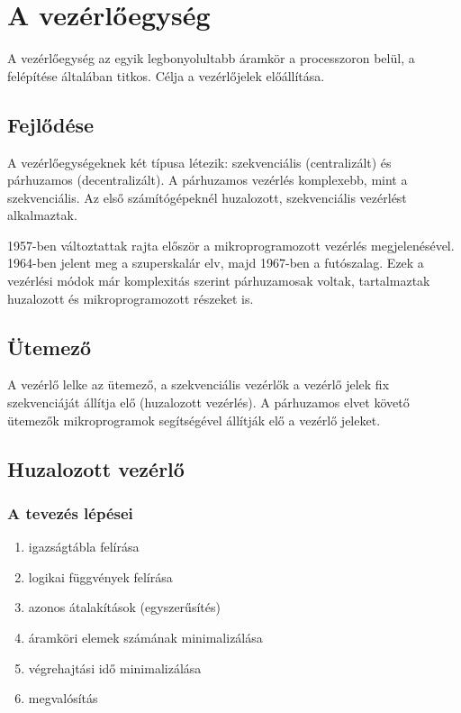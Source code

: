 
\chapter{A vezérlőegység}

A vezérlőegység az egyik legbonyolultabb áramkör a processzoron belül, a felépítése általában titkos.
Célja a vezérlőjelek előállítása.

\section{Fejlődése}
A vezérlőegységeknek két típusa létezik: szekvenciális (centralizált) és párhuzamos (decentralizált).
A párhuzamos vezérlés komplexebb, mint a szekvenciális.
Az első számítógépeknél huzalozott, szekvenciális vezérlést alkalmaztak.

1957-ben változtattak rajta először a mikroprogramozott vezérlés megjelenésével.
1964-ben jelent meg a szuperskalár elv, majd 1967-ben a futószalag.
Ezek a vezérlési módok már komplexitás szerint párhuzamosak voltak, tartalmaztak huzalozott és mikroprogramozott részeket is.

\section{Ütemező}
A vezérlő lelke az ütemező, a szekvenciális vezérlők a vezérlő jelek fix szekvenciáját állítja elő (huzalozott vezérlés).
A párhuzamos elvet követő ütemezők mikroprogramok segítségével állítják elő a vezérlő jeleket.

\section{Huzalozott vezérlő}
\subsection{A tevezés lépései}
\begin{enumerate}
    \item igazságtábla felírása
    \item logikai függvények felírása
    \item azonos átalakítások (egyszerűsítés)
    \item áramköri elemek számának minimalizálása
    \item végrehajtási idő minimalizálása
    \item megvalósítás
\end{enumerate}

